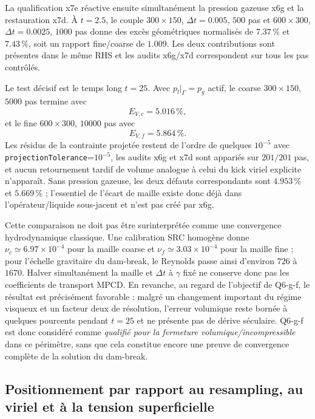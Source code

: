 \documentclass[11pt,a4paper]{article}
\begin{document}
La qualification x7e réactive ensuite simultanément la pression gazeuse x6g et la restauration x7d. À $t=2.5$, le couple $300\times150$, $\Delta t=0.005$, $500$ pas et $600\times300$, $\Delta t=0.0025$, $1000$ pas donne des excès géométriques normalisés de $7.37\,\%$ et $7.43\,\%$, soit un rapport fine/coarse de $1.009$. Les deux contributions sont présentes dans le même RHS et les audits x6g/x7d correspondent sur tous les pas contrôlés.

Le test décisif est le temps long $t=25$. Avec $p_l|_\Gamma=p_g$ actif, le coarse $300\times150$, $5000$ pas termine avec
\begin{equation}
  E_{V,c}=5.016\,\%,
\end{equation}
et le fine $600\times300$, $10000$ pas avec
\begin{equation}
  E_{V,f}=5.864\,\%.
\end{equation}
Les résidus de la contrainte projetée restent de l'ordre de quelques $10^{-5}$ avec \texttt{projectionTolerance}=$10^{-5}$, les audits x6g et x7d sont appariés sur $201/201$ pas, et aucun retournement tardif de volume analogue à celui du kick viriel explicite n'apparaît. Sans pression gazeuse, les deux défauts correspondants sont $4.953\,\%$ et $5.669\,\%$ ; l'essentiel de l'écart de maille existe donc déjà dans l'opérateur/liquide sous-jacent et n'est pas créé par x6g.

Cette comparaison ne doit pas être surinterprétée comme une convergence hydrodynamique classique. Une calibration SRC homogène donne $\nu_c\simeq6.97\times10^{-4}$ pour la maille coarse et $\nu_f\simeq3.03\times10^{-4}$ pour la maille fine ; pour l'échelle gravitaire du dam-break, le Reynolds passe ainsi d'environ $726$ à $1670$. Halver simultanément la maille et $\Delta t$ à $\gamma$ fixé ne conserve donc pas les coefficients de transport MPCD. En revanche, au regard de l'objectif de Q6-g-f, le résultat est précisément favorable : malgré un changement important du régime visqueux et un facteur deux de résolution, l'erreur volumique reste bornée à quelques pourcents pendant $t=25$ et ne présente pas de dérive séculaire. Q6-g-f est donc considéré comme \emph{qualifié pour la fermeture volumique/incompressible} dans ce périmètre, sans que cela constitue encore une preuve de convergence complète de la solution du dam-break.

\subsection{Positionnement par rapport au resampling, au viriel et à la tension superficielle}
\end{document}
